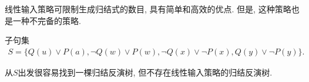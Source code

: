 线性输入策略可限制生成归结式的数目, 具有简单和高效的优点. 但是, 这种策略也是一种不完备的策略.
\begin{example}
子句集
\begin{align}
    S=\{Q(u)\vee P(a), \neg Q(w)\vee P(w), \neg Q(x)\vee \neg  P(x), Q(y)\vee \neg  P(y)\}.
\end{align}
\end{example}
从$S$出发很容易找到一棵归结反演树, 但不存在线性输入策略的归结反演树.
